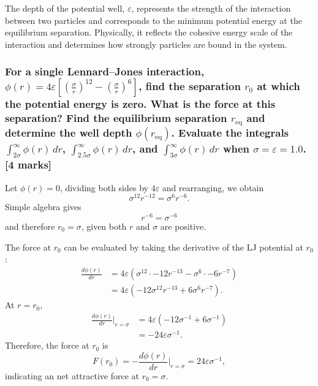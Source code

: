 \documentclass[a4paper,10pt,twocolumn]{article}
\begin{document}
The depth of the potential well, $\varepsilon$, represents the strength of the interaction between two particles and corresponds to the minimum potential energy at the equilibrium separation. Physically, it reflects the cohesive energy scale of the interaction and determines how strongly particles are bound in the system.

\subsubsection*{For a single Lennard--Jones interaction, $\phi(r)=4\varepsilon\left[\left(\frac{\sigma}{r}\right)^{12}-\left(\frac{\sigma}{r}\right)^6\right]$, find the separation $r_0$ at which the potential energy is zero. What is the force at this separation? Find the equilibrium separation $r_{\mathrm{eq}}$ and determine the well depth $\phi(r_{\mathrm{eq}})$. Evaluate the integrals $\int_{2\sigma}^{\infty}\phi(r)\,dr$, $\int_{2.5\sigma}^{\infty}\phi(r)\,dr$, and $\int_{3\sigma}^{\infty}\phi(r)\,dr$ when $\sigma=\varepsilon=1.0$.
[4 marks]}

Let $\phi(r)=0$, dividing both sides by $4\varepsilon$ and rearranging, we obtain
\[
\sigma^{12}{r}^{-12}=\sigma^{6}{r}^{-6}.
\]
Simple algebra gives
\[
r^{-6}=\sigma^{-6}
\]
and therefore $r_0=\sigma$, given both $r$ and $\sigma$ are positive.

The force at $r_0$ can be evaluated by taking the derivative of the LJ potential at $r_0$:
\begin{align*}
\frac{d\phi(r)}{d r}
&= 4\varepsilon\left(\sigma^{12}\cdot -12r^{-13}-\sigma^{6}\cdot -6r^{-7} \right)
\\
&= 4\varepsilon\left(-12\sigma^{12}r^{-13}+6\sigma^{6}r^{-7} \right).
\end{align*}
At $r=r_0$,
\begin{align*}
\frac{d\phi(r)}{d r}\Big|_{r=\sigma}
&= 4\varepsilon\left(-12\sigma^{-1}+6\sigma^{-1} \right)
\\
&= -24\varepsilon\sigma^{-1}.
\end{align*}
Therefore, the force at $r_0$ is 
\[
F(r_0)=-\frac{d\phi(r)}{d r}\Big|_{r=\sigma}=24\varepsilon\sigma^{-1},
\]
indicating an net attractive force at $r_0=\sigma$.
\end{document}

